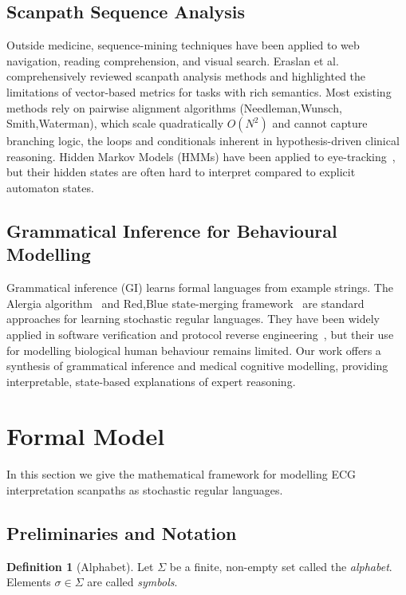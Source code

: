 \documentclass[sigconf]{acmart}
\theoremstyle{plain}
\theoremstyle{definition}
\newtheorem{definition}{Definition}
\begin{document}
\subsection{Scanpath Sequence Analysis}
Outside medicine, sequence-mining techniques have been applied to web navigation, reading comprehension, and visual search.
Eraslan et al.~\cite{eraslan2019} comprehensively reviewed scanpath analysis methods and highlighted the limitations of vector-based metrics for tasks with rich semantics.
Most existing methods rely on pairwise alignment algorithms (Needleman,Wunsch, Smith,Waterman), which scale quadratically $O(N^2)$ and cannot capture branching logic, the loops and conditionals inherent in hypothesis-driven clinical reasoning.
Hidden Markov Models (HMMs) have been applied to eye-tracking~\cite{dupont2005}, but their hidden states are often hard to interpret compared to explicit automaton states.

\subsection{Grammatical Inference for Behavioural Modelling}
Grammatical inference (GI) learns formal languages from example strings.
The Alergia algorithm~\cite{carrasco1994} and Red,Blue state-merging framework~\cite{verwer2014} are standard approaches for learning stochastic regular languages.
They have been widely applied in software verification and protocol reverse engineering~\cite{muskardin2021}, but their use for modelling biological human behaviour remains limited.
Our work offers a synthesis of grammatical inference and medical cognitive modelling, providing interpretable, state-based explanations of expert reasoning.

\section{Formal Model}

In this section we give the mathematical framework for modelling ECG interpretation scanpaths as stochastic regular languages.

\subsection{Preliminaries and Notation}

\begin{definition}[Alphabet]
Let $\Sigma$ be a finite, non-empty set called the \emph{alphabet}.
Elements $\sigma \in \Sigma$ are called \emph{symbols}.
\end{definition}
\end{document}
